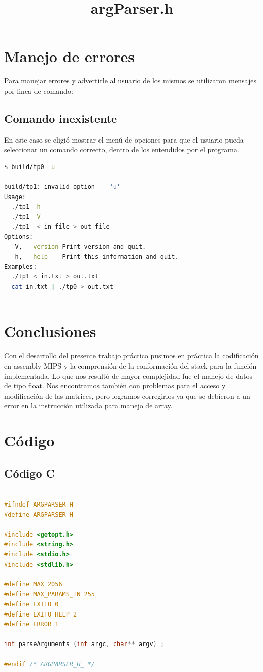 \documentclass[a4paper,10pt]{article}
\begin{document}
\section{Manejo de errores}
Para manejar errores y advertirle al usuario de los mismos se utilizaron mensajes por linea de comando:\\

\subsection{Comando inexistente}
En este caso se eligió mostrar el menú de opciones para que el usuario pueda seleccionar un comando correcto, dentro de los entendidos por el programa.

\begin{lstlisting}[language=bash]
$ build/tp0 -u

build/tp1: invalid option -- 'u'
Usage:
  ./tp1 -h
  ./tp1 -V
  ./tp1  < in_file > out_file
Options:
  -V, --version	Print version and quit.
  -h, --help	Print this information and quit.
Examples:
  ./tp1 < in.txt > out.txt
  cat in.txt | ./tp0 > out.txt
  
\end{lstlisting}
\newpage


\section{Conclusiones}
Con el desarrollo del presente trabajo pr\'actico pusimos en pr\'actica la codificaci\'on en assembly MIPS y la comprensi\'on de la conformaci\'on del stack para la funci\'on implementada. Lo que nos result\'o de mayor complejidad fue el manejo de datos de tipo float. Nos encontramos tambi\'en con problemas para el acceso y modificaci\'on de las matrices, pero logramos corregirlos ya que se deb\'ieron a un error en la instrucci\'on utilizada para manejo de array.\\


\newpage

\section{C\'odigo}


\subsection{C\'odigo C}
\title{argParser.h}
\begin{lstlisting}[language=C]

#ifndef ARGPARSER_H_
#define ARGPARSER_H_

#include <getopt.h>
#include <string.h>
#include <stdio.h>
#include <stdlib.h>

#define MAX 2056
#define MAX_PARAMS_IN 255
#define EXITO 0
#define EXITO_HELP 2
#define ERROR 1

int parseArguments (int argc, char** argv) ;

#endif /* ARGPARSER_H_ */

\end{lstlisting}
\end{document}
